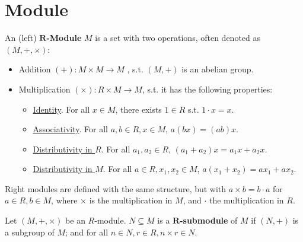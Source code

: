 \documentclass{article}
\begin{document}

\tableofcontents
\newpage

\section{Module}

\begin{definition}[$R$-Module]
    An (left) \textbf{$\bm{R}$-Module} $M$ is a set with two operations, often denoted as $(M, +, \times)$:
    \begin{itemize}
        \item Addition $(+): M\times M \to M$ , s.t. $(M, +)$ is an abelian group.
        \item Multiplication $(\times): R\times M \to M$, s.t. it has the following properties:
            \begin{itemize}
                \item \underline{Identity}. For all $x\in M$, there exists $1\in R$ s.t. $1\cdot x = x$.
                \item \underline{Associativity}. For all $a, b\in R, x\in M$, $a(bx) = (ab)x$.
                \item \underline{Distributivity in $R$}. For all $a_1, a_2\in R$, $(a_1 + a_2)x = a_1 x + a_2 x$.
                \item \underline{Distributivity in $M$}. For all $a\in R, x_1, x_2\in M$, $a(x_1 + x_2) = a x_1 + a x_2$.
            \end{itemize}
    \end{itemize}
    Right modules are defined with the same structure, but with $a\times b = b\cdot a$ for $a\in R, b\in M$, where $\times$ is the multiplication in $M$, and $\cdot$ the multiplication in $R$.
\end{definition}

\begin{definition}[Submodule]
    Let $(M, +, \times)$ be an $R$-module. $N \subseteq M$ is a \textbf{$\bm{R}$-submodule} of $M$ if $(N, +)$ is a subgroup of $M$; and for all $n\in N, r\in R, n\times r\in N$.
\end{definition}
\end{document}
